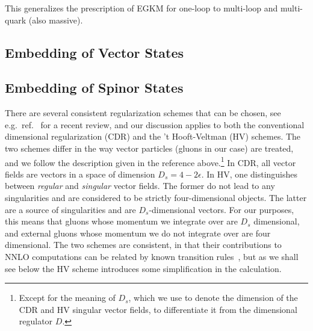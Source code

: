 This generalizes the prescription of EGKM for one-loop to multi-loop and
multi-quark (also massive).

\subsection{Embedding of Vector States}

\subsection{Embedding of Spinor States}
\label{sec:Clifford}


There are several consistent regularization schemes that can be
chosen, see
e.g.\ ref.~\cite{Gnendiger:2017pys} for a recent review, and our
discussion applies to both the conventional
dimensional regularization (CDR) and the 't Hooft-Veltman (HV)
schemes. The two schemes differ in the way
vector particles (gluons in our case) are treated,
and we follow 
the description given in the reference
above.\footnote{Except for the meaning of $D_s$, which we use 
to denote the dimension of the CDR and HV singular vector 
fields, to differentiate it from the dimensional regulator $D$.}
In CDR, all vector fields are vectors in a space of dimension
$D_s=4-2\epsilon$. In
HV, one distinguishes between \emph{regular} and 
\emph{singular} vector 
fields. The former do not lead to any singularities and 
are considered to be
strictly four-dimensional objects. The
latter are a source of singularities and are 
$D_s$-dimensional vectors. For our purposes, this means
that gluons whose momentum we integrate over are 
$D_s$ dimensional, and external gluons whose momentum
we do not integrate over are
four dimensional. The two schemes are consistent,
in that their contributions to NNLO computations can be related by known
transition rules~\cite{Broggio:2015dga}, but as we
shall see below the HV scheme introduces some simplification in
the calculation.


